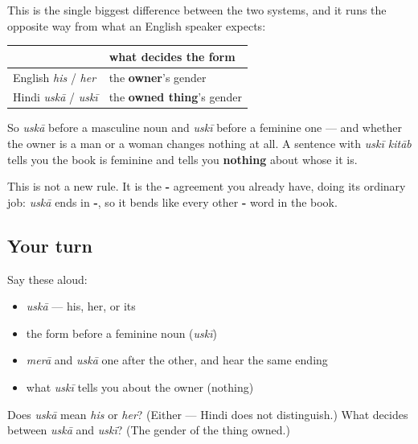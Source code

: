 \begin{grammarlens}[title={Grammar Lens: English agrees with the owner, Hindi with the thing}]
This is the single biggest difference between the two systems, and it runs the opposite way from what an English speaker expects:

\noindent
\begin{tabularx}{\linewidth}{@{}>{\raggedright\arraybackslash}X>{\raggedright\arraybackslash}X@{}}
\toprule
\textbf{} & \textbf{what decides the form} \\
\midrule
English \emph{his} / \emph{her} & the \textbf{owner}'s gender \\
Hindi \emph{uskā} / \emph{uskī} & the \textbf{owned thing}'s gender \\
\bottomrule
\end{tabularx}

So \emph{uskā} before a masculine noun and \emph{uskī} before a feminine one — and whether the owner is a man or a woman changes nothing at all. A sentence with \emph{uskī kitāb} tells you the book is feminine and tells you \textbf{nothing} about whose it is.

This is not a new rule. It is the \textbf{-} agreement you already have, doing its ordinary job: \emph{uskā} ends in \textbf{-}, so it bends like every other \textbf{-} word in the book.
\end{grammarlens}

\subsection*{Your turn}
Say these aloud:

\begin{itemize}
\raggedright
  \item \emph{uskā} — his, her, or its
  \item the form before a feminine noun (\emph{uskī})
  \item \emph{merā} and \emph{uskā} one after the other, and hear the same ending
  \item what \emph{uskī} tells you about the owner (nothing)
\end{itemize}

\begin{tcolorbox}[breakable,colback=teal!4,colframe=teal!35!black,title={Before you move on}]
Does \emph{uskā} mean \emph{his} or \emph{her}? (Either — Hindi does not distinguish.) What decides between \emph{uskā} and \emph{uskī}? (The gender of the thing owned.)
\end{tcolorbox}

